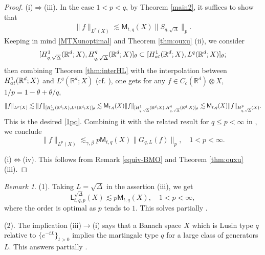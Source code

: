 \documentclass[oneside,english,a4wide]{amsart}
\numberwithin{equation}{section}
\numberwithin{figure}{section}
\theoremstyle{plain}
\theoremstyle{plain}
\theoremstyle{definition}
\theoremstyle{plain}
\theoremstyle{remark}
\theoremstyle{definition}
\theoremstyle{remark}
\newtheorem{remark}[thm]{Remark}
\theoremstyle{definition}
\newcommand{\real}{{\mathbb R}}
\newcommand{\com}{{\mathbb C}}
\newcommand{\ot}{\otimes}
\newcommand{\8}{+\infty}
\renewcommand{\1}{\mathbbm{1}}
\newcommand{\at}{{\rm at}}
\begin{document}
{\begin{proof}
(i)$\Rightarrow$(iii). In the case $1 < p < q$, by Theorem \ref{main2}, it suffices to show that
\begin{align}\label{1pq}
    \| f \|_{L^p(X)} \lesssim \mathsf{M}_{t, q}(X)\| S_{q, \sqrt{\Delta}} \|_p.
\end{align}
Keeping in mind \eqref{MTXunoptimal} and Theorem \ref{thm:ouxu} (ii), we consider
\[
    [H^1_{q, \sqrt{\Delta}}(\real^d; X), H^{q}_{q, \sqrt{\Delta}}(\real^d; X)]_\theta \subset [H^1_{\at}(\real^d; X), L^q(\real^d; X)]_{\theta};
\]
then combining Theorem \ref{thm:interHL} with the interpolation between $H^1_{\at}(\real^d; X)$ and $L^q(\real^d; X)$ (cf. \cite[Theorem A]{Blasco1989}), one gets for any $f \in C_c(\real^d)\ot X$, $1/p = 1-\theta + \theta/q$,
\[
    \| f \|_{L^p(X)} \lesssim \| f \|_{ [H^1_{\at}(\real^d; X), L^q(\real^d; X)]_{\theta} } \lesssim \mathsf{M}_{t, q}(X)\| f \|_{[H^1_{q, \sqrt{\Delta}}(\real^d; X), H^{q}_{q, \sqrt{\Delta}}(\real^d;X)]_\theta} \lesssim \mathsf{M}_{t, q}(X)\| f \|_{H^p_{q, \sqrt{\Delta}}(X)}.
\]
This is the desired \eqref{1pq}. 
Combining it with the related result for $q \leq p < \infty$ in \cite{Xu2021}, we conclude 
\[
    \| f \|_{L^p(X)} \lesssim_{\gamma, \beta} p\mathsf{M}_{t, q}(X)\| G_{q, L}(f) \|_p, \quad 1 < p < \infty .
\]

(i)$\Leftrightarrow$(iv). This follows from Remark \ref{equiv-BMO} and Theorem \ref{thm:ouxu} (iii).
\end{proof}

\begin{remark}\label{SovlePro}
(1). Taking $L=\sqrt{\Delta}$  in the assertion (iii), we get {
    \[
        \mathsf{L}_{t, q, p}^{\sqrt{\Delta}} (X)\lesssim p\mathsf{M}_{t,q}(X),\quad 1 < p < \infty,
    \]}
where the order is optimal as $p$ tends to $1$. This solves partially \cite[Problem 1.8]{Xu2021}. 

(2). The implication (iii)$\rightarrow$(i) says that a Banach space $X$ which is Lusin type $q$ relative to $\{e^{-tL}\}_{t>0}$ implies the martingale type $q$ for a large class of generators $L$. This answers partially \cite[Problem A.1 and Conjecture A.4]{Xu2021}.

\end{remark}







}
\end{document}
